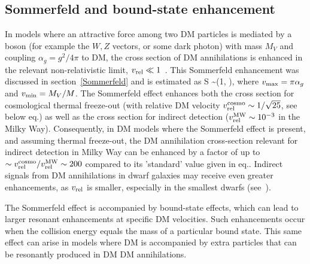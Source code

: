 \subsection{Sommerfeld and bound-state enhancement}\label{sec:sommerfeld}

In models where an attractive force among two DM particles is mediated by a boson (for example the $W,Z$ vectors, or some dark photon)
with mass $M_V$ and coupling  $\alpha_g =g^2/4\pi $ to DM,
the cross section of DM annihilations is enhanced in the relevant non-relativistic limit, $ v_{\rm rel}\ll 1$~\cite{Sommerfeld}.
This Sommerfeld enhancement was discussed in section~\ref{Sommerfeld} and is estimated as 
\beq S \sim \max \left(1,  \right),
\eeq
 where
$v_{\rm max} =\pi\alpha_g$ and $ v_{\rm min} =M_V/M $.
The Sommerfeld effect enhances both
the cross section for cosmological thermal freeze-out 
(with relative DM velocity $v_{\rm rel}^{\rm cosmo} \sim 1/\sqrt{25}$, see below eq.)
as well as the cross section for indirect detection ($v_{\rm rel}^{\rm MW}\sim 10^{-3}$ in the Milky Way).
 Consequently, in DM models where the Sommerfeld effect is present, and assuming thermal freeze-out, the DM annihilation cross-section relevant for indirect detection in Milky Way can be enhanced by a factor of up to $\sim v_{\rm rel}^{\rm cosmo}/v_{\rm rel}^{\rm MW} \sim 200$ compared to its 'standard' value given in eq..
Indirect signals from DM annihilations in dwarf galaxies may receive even greater enhancements, as $v_{\rm rel}$ is smaller,
especially in the smallest dwarfs (see~\cite{1702.00408}).

\smallskip

The Sommerfeld effect is accompanied by bound-state effects, 
which can lead to larger resonant enhancements at specific DM velocities. 
Such enhancements occur when the collision energy equals the mass of a particular bound state.
This same effect can arise in models where DM is accompanied by extra particles that can be resonantly produced
in DM DM annihilations.




